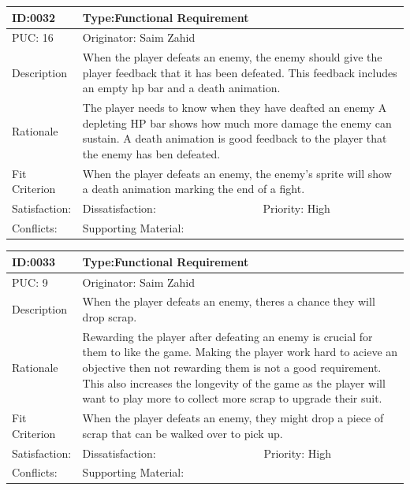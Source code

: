 \documentclass{article}
\begin{document}
	\begin{table}[H]
		\begin{tabular}{|l|l|l|}
			\hline
			ID:0032 & \multicolumn{2}{l|}{Type:Functional Requirement} \\ \hline
			PUC: 16 & \multicolumn{2}{l|}{Originator: Saim Zahid} \\ \hline
			Description & \multicolumn{2}{m{0.85\textwidth}|}{When the player defeats an enemy, the enemy should give the player feedback that it has been defeated. This feedback includes an empty hp bar and a death animation.} \\ \hline
			Rationale & \multicolumn{2}{m{0.85\textwidth}|}{The player needs to know when they have deafted an enemy A depleting HP bar shows how much more damage the enemy can sustain. A death animation is good feedback to the player that the enemy has ben defeated.} \\ \hline
			Fit Criterion & \multicolumn{2}{m{0.85\textwidth}|}{When the player defeats an enemy, the enemy's sprite will show a death animation marking the end of a fight.} \\ \hline
			Satisfaction: & Dissatisfaction: & Priority: High\\ \hline
			Conflicts: & \multicolumn{2}{l|}{Supporting Material:} \\ \hline
		\end{tabular}
	\end{table}

	\begin{table}[H]
		\begin{tabular}{|l|l|l|}
			\hline
			ID:0033 & \multicolumn{2}{l|}{Type:Functional Requirement} \\ \hline
			PUC: 9 & \multicolumn{2}{l|}{Originator: Saim Zahid} \\ \hline
			Description & \multicolumn{2}{m{0.85\textwidth}|}{When the player defeats an enemy, theres a chance they will drop scrap.} \\ \hline
			Rationale & \multicolumn{2}{m{0.85\textwidth}|}{Rewarding the player after defeating an enemy is crucial for them to like the game. Making the player work hard to acieve an objective then not rewarding them is not a good requirement. This also increases the longevity of the game as the player will want to play more to collect more scrap to upgrade their suit.} \\ \hline
			Fit Criterion & \multicolumn{2}{m{0.85\textwidth}|}{When the player defeats an enemy, they might drop a piece of scrap that can be walked over to pick up.} \\ \hline
			Satisfaction: & Dissatisfaction: & Priority: High\\ \hline
			Conflicts: & \multicolumn{2}{l|}{Supporting Material:} \\ \hline
		\end{tabular}
	\end{table}
\end{document}
